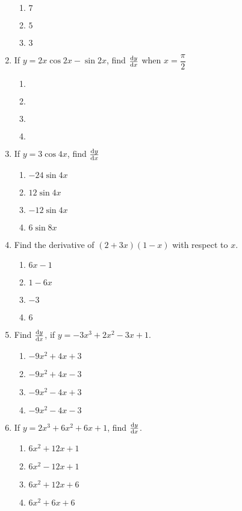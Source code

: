 \begin{multicols}{2}
\begin{enumerate}[label={\arabic*.}]
\begin{enumerate}[label={\Alph*.}]
	\item \(7\)
	\item \(5\)
	\item \(3\)
	\end{enumerate}
\item If \(y = 2x\cos{2x}-\sin{2x}\), find \(\dv{y}{x}\) when \(x=\dfrac{\pi}{2}\)
	\begin{enumerate}[label={\Alph*.}]
	\item \(\)
	\item \(\)
	\item \(\)
	\item \(\)
	\end{enumerate}
\item If \(y=3\cos{4x}\), find \(\dv{y}{x}\)
	\begin{enumerate}[label={\Alph*.}]
	\item \(-24\sin{4x}\)
	\item \(12\sin{4x}\)
	\item \(-12 \sin{4x}\)
	\item \(6\sin{8x}\)
	\end{enumerate}
\item Find the derivative of \((2+3x)(1-x)\) with respect to \(x\).
	\begin{enumerate}[label={\Alph*.}]
	\item \(6x-1\)
	\item \(1-6x\)
	\item \(-3\)
	\item \(6\)
	\end{enumerate}
\item Find \(\dv{y}{x}\), if \(y = -3{x}^{3}+2{x}^{2}-3x+1\).
	\begin{enumerate}[label={\Alph*.}]
	\item \(-9{x}^{2}+4{x}+3\)
	\item \(-9{x}^{2}+4{x}-3\)
	\item \(-9{x}^{2}-4{x}+3\)
	\item \(-9{x}^{2}-4{x}-3\)
	\end{enumerate}
\item If \(y = 2{x}^{3}+6{x}^{2}+6x+1\), find \(\dv{y}{x}\).
	\begin{enumerate}[label={\Alph*.}]
	\item \(6{x}^{2}+12{x}+1\)
	\item \(6{x}^{2}-12{x}+1\)
	\item \(6{x}^{2}+12{x}+6\)
	\item \(6{x}^{2}+6{x}+6\)
	\end{enumerate}

\end{enumerate}
\end{multicols}
